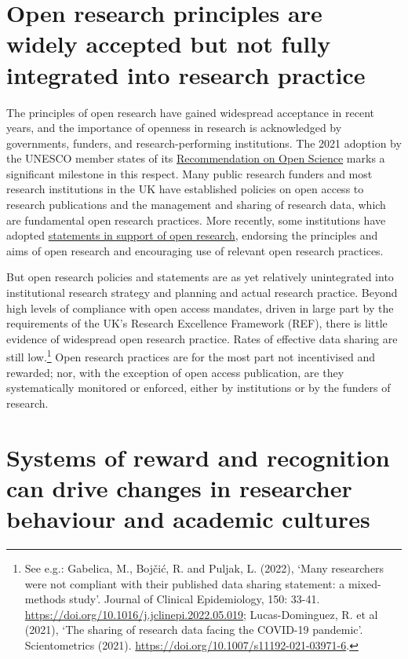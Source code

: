 \documentclass[
  letterpaper,
  DIV=11,
  numbers=noendperiod,
  oneside]{scrreprt}
\begin{document}
\section{Open research principles are widely accepted but not fully
integrated into research
practice}\label{open-research-principles-are-widely-accepted-but-not-fully-integrated-into-research-practice}

The principles of open research have gained widespread acceptance in
recent years, and the importance of openness in research is acknowledged
by governments, funders, and research-performing institutions. The 2021
adoption by the UNESCO member states of its
\href{https://doi.org/10.54677/MNMH8546}{Recommendation on Open Science}
marks a significant milestone in this respect. Many public research
funders and most research institutions in the UK have established
policies on open access to research publications and the management and
sharing of research data, which are fundamental open research practices.
More recently, some institutions have adopted
\href{https://www.ukcorr.org/2020/12/02/open-access-is-not-enough-reproducible-science-research-and-scholarship/}{statements
in support of open research}, endorsing the principles and aims of open
research and encouraging use of relevant open research practices.

But open research policies and statements are as yet relatively
unintegrated into institutional research strategy and planning and
actual research practice. Beyond high levels of compliance with open
access mandates, driven in large part by the requirements of the UK's
Research Excellence Framework (REF), there is little evidence of
widespread open research practice. Rates of effective data sharing are
still low.\footnote{See e.g.: Gabelica, M., Bojčić, R. and Puljak, L.
  (2022), `Many researchers were not compliant with their published data
  sharing statement: a mixed-methods study'. Journal of Clinical
  Epidemiology, 150: 33-41.
  \url{https://doi.org/10.1016/j.jclinepi.2022.05.019}; Lucas-Dominguez,
  R. et al (2021), `The sharing of research data facing the COVID-19
  pandemic'. Scientometrics (2021).
  \url{https://doi.org/10.1007/s11192-021-03971-6}.} Open research
practices are for the most part not incentivised and rewarded; nor, with
the exception of open access publication, are they systematically
monitored or enforced, either by institutions or by the funders of
research.

\section{Systems of reward and recognition can drive changes in
researcher behaviour and academic
cultures}\label{systems-of-reward-and-recognition-can-drive-changes-in-researcher-behaviour-and-academic-cultures}
\end{document}

